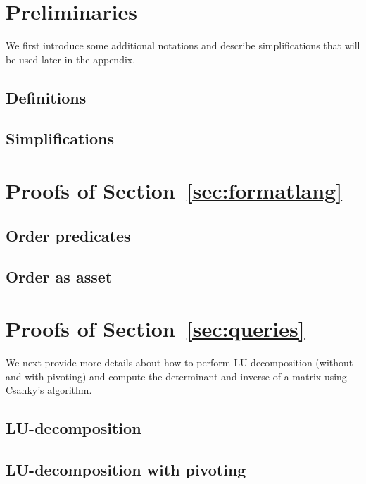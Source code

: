 
\section{Preliminaries}
We first introduce some additional notations and describe simplifications that will be used later in the appendix.
\subsection{Definitions}
\label{app:def}

\subsection{Simplifications}\label{app:simp}



\section{Proofs of Section~\ref{sec:formatlang}}

\subsection{Order predicates}\label{app:order}

\subsection{Order as asset}\label{app:asset_order}



\section{Proofs of Section~\ref{sec:queries}}
We next provide more details about how to perform LU-decomposition (without and with pivoting)
and compute the determinant and inverse of a matrix using Csanky's algorithm.

\subsection{LU-decomposition}


\subsection{LU-decomposition with pivoting}


